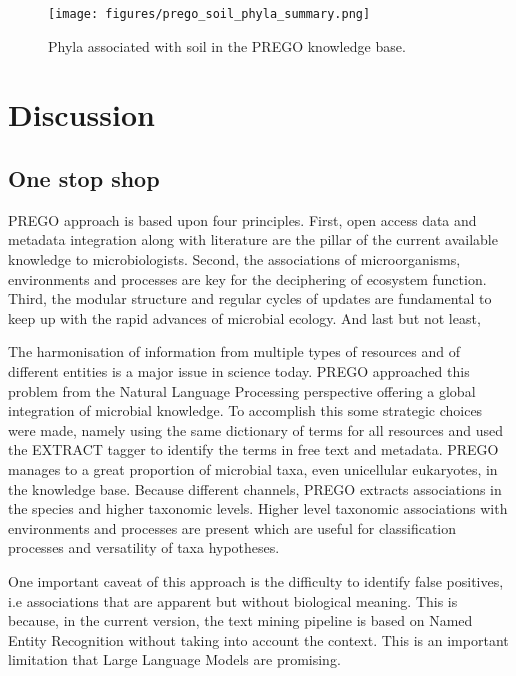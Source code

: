    \begin{figure}[hbt!]
      \centering
      \texttt{[image: figures/prego\_soil\_phyla\_summary.png]}
      \caption[PREGO soil taxonomy summary]{
         Phyla associated with soil in the PREGO knowledge base.}
      \label{fig:prego-soil-phyla}
   \end{figure}


\section{Discussion}
\label{sec:prego-discussion}

   \subsection{One stop shop}
   \label{subsec:prego-contents-disc}

PREGO approach is based upon four principles. First, open access data and
metadata integration along with literature are the pillar of the current
available knowledge to microbiologists. Second, the associations of microorganisms,
environments and processes are key for the deciphering of ecosystem function.
Third, the modular structure and regular cycles of updates are fundamental to
keep up with the rapid advances of microbial ecology. And last but not least,

The harmonisation of information from multiple types of resources and of different
entities is a major issue in science today. PREGO approached this problem from 
the Natural Language Processing perspective offering a global integration 
of microbial knowledge. To accomplish this some strategic choices were made, 
namely using the same dictionary of terms for all resources and used 
the EXTRACT tagger to identify the terms in free text and metadata.
PREGO manages to a great proportion of microbial taxa, even unicellular eukaryotes, in the knowledge base.
Because different channels, PREGO extracts associations in the species and higher taxonomic levels.
Higher level taxonomic associations with environments and processes are present
which are useful for classification processes and versatility of taxa hypotheses.

One important caveat of this approach is the difficulty to 
identify false positives, i.e associations that are apparent but without 
biological meaning. This is because, in the current version, the text mining
pipeline is based on Named Entity Recognition without taking into account 
the context. This is an important limitation that Large Language Models 
are promising.

